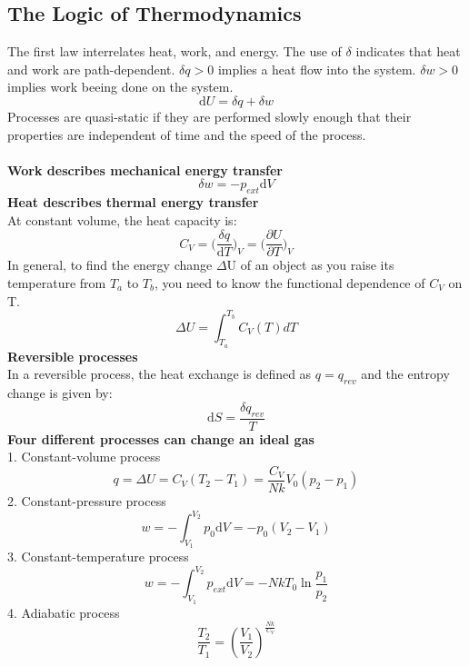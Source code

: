 \documentclass[8pt]{article}
\numberwithin{equation}{section}
\begin{document}
\begin{multicols}{2}
\section{The Logic of Thermodynamics}
The first law interrelates heat, work, and energy. The use of $\delta$ indicates that heat and work are path-dependent. $\delta q > 0$ implies a heat flow into the system. $\delta w > 0$ implies work beeing done on the system. 
\begin{equation}
\mathrm{d}U=\delta q+\delta w \tag{7.1}
\end{equation}
Processes are quasi-static if they are performed slowly enough that their properties are independent of time and the speed of the process. \\\\
\textbf{Work describes mechanical energy transfer} 
\begin{equation}
\delta w = -p_{ext}\mathrm{d}V \tag{7.2}
\end{equation}
\textbf{Heat describes thermal energy transfer} \\ At constant volume, the heat capacity is: 
\begin{equation}
C_V=\bigg( \frac{\delta q}{\mathrm{d} T} \bigg)_{V}=\bigg(\frac{\partial U}{\partial T} \bigg)_{V} \tag{7.3}
\end{equation}
In general, to find the energy change $\Delta$U of an object as you raise its temperature from $T_{a}$ to $T_{b}$, you need to know the functional dependence of $C_{V}$ on T. 
\begin{equation}
\Delta U = \int_{T_{a}}^{T_{b}} C_{V}(T) dT \tag{7.4}
\end{equation}
\textbf{Reversible processes} \\
In a reversible process, the heat exchange is defined as $q=q_{rev}$ and the entropy change is given by: 
\begin{equation}
\mathrm{d}S=\frac{\delta q_{rev}}{T} \tag{7.8}
\end{equation}
\textbf{Four different processes can change an ideal gas} \\
1. Constant-volume process 
\begin{equation}
q=\Delta U=C_{V}(T_{2}-T_{1})=\frac{C_{V}}{Nk}V_{0}(p_{2}-p_{1}) \tag{7.11}
\end{equation}
2. Constant-pressure process 
\begin{equation}
w=-\int_{V_{1}}^{V_{2}} p_{0}\mathrm{d}V=-p_{0}(V_{2}-V_{1}) \tag{7.12}
\end{equation}
3. Constant-temperature process 
\begin{equation}
w=-\int_{V_{1}}^{V_{2}} p_{ext}\mathrm{d}V=-NkT_{0}\ln{\frac{p_{1}}{p_{2}}} \tag{7.15}
\end{equation}
4. Adiabatic process 
\begin{equation}
\frac{T_{2}}{T_{1}}=(\frac{V_{1}}{V_{2}})^{\frac{Nk}{C_{V}}} \tag{7.21}
\end{equation}

\end{multicols}
\end{document}
